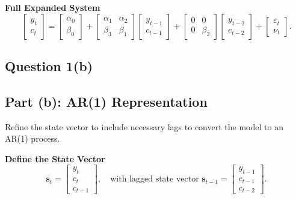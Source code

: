 \documentclass{article}
\begin{document}
\textbf{Full Expanded System}
\[
\begin{bmatrix}
    y_t \\ 
    c_t
\end{bmatrix}
=
\begin{bmatrix}
    \alpha_0 \\ 
    \beta_0
\end{bmatrix}
+
\begin{bmatrix}
    \alpha_1 & \alpha_2 \\ 
    \beta_3 & \beta_1
\end{bmatrix}
\begin{bmatrix}
    y_{t-1} \\ 
    c_{t-1}
\end{bmatrix}
+
\begin{bmatrix}
    0 & 0 \\ 
    0 & \beta_2
\end{bmatrix}
\begin{bmatrix}
    y_{t-2} \\ 
    c_{t-2}
\end{bmatrix}
+
\begin{bmatrix}
    \varepsilon_t \\ 
    \nu_t
\end{bmatrix}.
\]

\subsection*{Question 1(b)}
\subsection*{Part (b): AR(1) Representation}

Refine the state vector to include necessary lags to convert the model to an AR(1) process.

\textbf{Define the State Vector}
\[
\bm{s}_t = 
\begin{bmatrix}
    y_t \\ 
    c_t \\ 
    c_{t-1}
\end{bmatrix},
\quad \text{with lagged state vector } \bm{s}_{t-1} = 
\begin{bmatrix}
    y_{t-1} \\ 
    c_{t-1} \\ 
    c_{t-2}
\end{bmatrix}.
\]
\end{document}
